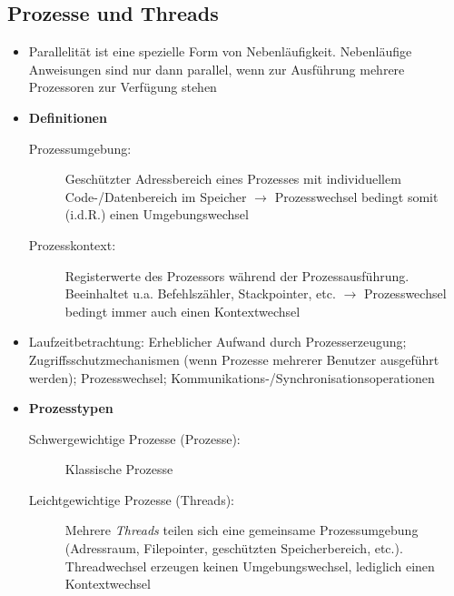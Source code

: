 \subsection{Prozesse und Threads}
\begin{itemize}
	\item Parallelität ist eine spezielle Form von Nebenläufigkeit. Nebenläufige Anweisungen sind nur dann parallel, wenn zur Ausführung mehrere Prozessoren zur Verfügung stehen
	\item \textbf{Definitionen}
	\begin{description}
		\item[Prozessumgebung:] Geschützter Adressbereich eines Prozesses mit individuellem Code-/Datenbereich im Speicher \(\rightarrow\) Prozesswechsel bedingt somit (i.d.R.) einen Umgebungswechsel
		\item[Prozesskontext:] Registerwerte des Prozessors während der Prozessausführung. Beeinhaltet u.a. Befehlszähler, Stackpointer, etc. \(\rightarrow\) Prozesswechsel bedingt immer auch einen Kontextwechsel
	\end{description}
	\item Laufzeitbetrachtung: Erheblicher Aufwand durch Prozesserzeugung; Zugriffsschutzmechanismen (wenn Prozesse mehrerer Benutzer ausgeführt werden); Prozesswechsel; Kommunikations-/Synchronisationsoperationen
	\item \textbf{Prozesstypen}
	\begin{description}
		\item[Schwergewichtige Prozesse (Prozesse):] Klassische Prozesse
		\item[Leichtgewichtige Prozesse (Threads):] Mehrere \textit{Threads} teilen sich eine gemeinsame Prozessumgebung (Adressraum, Filepointer, geschützten Speicherbereich, etc.). Threadwechsel erzeugen keinen Umgebungswechsel, lediglich einen Kontextwechsel
	\end{description}
\end{itemize}


